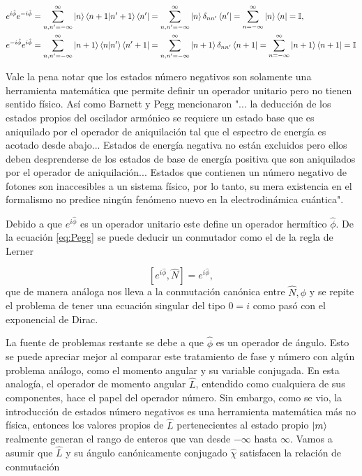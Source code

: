         \begin{align}\label{eq:Pegg}
            &e^{i\hat{\phi}}e^{-i\hat{\phi}} = \sum_{n,n'=-\infty}^{\infty} \ket{n}\braket{n+1|n'+1}\bra{n'} = \sum_{n,n'=-\infty}^{\infty}\ket{n}\delta_{nn'}\bra{n'} = \sum_{n=-\infty}^\infty\ket{n}\bra{n}= \mathbb{I},\\
            & e^{-i\hat{\phi}}e^{i\hat{\phi}} = \sum_{n,n'=-\infty}^{\infty}\ket{n+1}\braket{n|n'}\bra{n'+1} = \sum_{n,n'=-\infty}^{\infty}\ket{n+1}\delta_{nn'}\bra{n+1} = \sum_{n=-\infty}^{\infty}\ket{n+1}\bra{n+1}= \mathbb{I}
        \end{align}

        Vale la pena notar que los estados número negativos son solamente una herramienta matemática que permite definir un operador unitario pero no tienen sentido físico. Así como Barnett y Pegg mencionaron "... la deducción de los estados propios del oscilador armónico se requiere un estado base que es aniquilado por el operador de aniquilación tal que el espectro de energía es acotado desde abajo... Estados de energía negativa no están excluidos pero ellos deben desprenderse de los estados de base de energía positiva que son aniquilados por el operador de aniquilación... Estados que contienen un número negativo de fotones son inaccesibles a un sistema físico, por lo tanto, su mera existencia en el formalismo no predice ningún fenómeno nuevo en la electrodinámica cuántica".

        Debido a que $e^{i\hat{\phi}}$ es un operador unitario este define un operador hermítico $\hat{\phi}$. De la ecuación \ref{eq:Pegg} se puede deducir un conmutador como el de la regla de Lerner

        \begin{equation}
            \left[ e^{i\hat{\phi}},\hat{N} \right] = e^{i\hat{\phi}},
        \end{equation}
        que de manera análoga nos lleva a la conmutación canónica entre $\hat{N},\hat{\phi}$ y se repite el problema de tener una ecuación singular del tipo $0=i$ como pasó con el exponencial de Dirac.

        La fuente de problemas restante se debe a que $\hat{\phi}$ es un operador de ángulo. Esto se puede apreciar mejor al comparar este tratamiento de fase y número con algún problema análogo, como el momento angular y su variable conjugada. En esta analogía, el operador de momento angular $\hat{L}$, entendido como cualquiera de sus componentes, hace el papel del operador número. Sin embargo, como se vio, la introducción de estados número negativos es una herramienta matemática más no física, entonces los valores propios de $\hat{L}$ pertenecientes al estado propio $\ket{m}$ realmente generan el rango de enteros que van desde $-\infty$ hasta $\infty$. Vamos a asumir que $\hat{L}$ y su ángulo canónicamente conjugado $\hat{\chi}$ satisfacen la relación de conmutación

